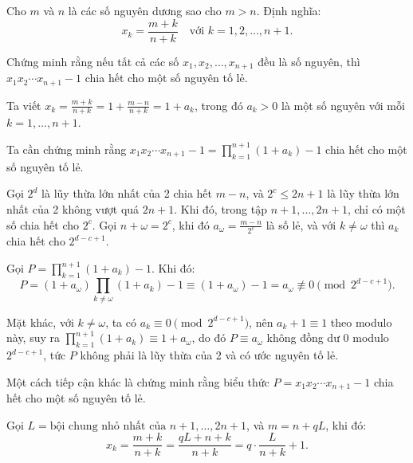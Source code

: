 \ifshowproblemandsoln
\ifshowproblem\begin{problem}\label{problem:IMO-2015-SL-P3}\fi
\ifshowsoln\begin{problem}\fi
    Cho \( m \) và \( n \) là các số nguyên dương sao cho \( m > n \). Định nghĩa:
    \[
        x_k = \frac{m + k}{n + k} \quad \text{với } k = 1, 2, \ldots, n + 1.
    \]

    Chứng minh rằng nếu tất cả các số \( x_1, x_2, \ldots, x_{n+1} \) đều là số nguyên,
    thì \( x_1 x_2 \cdots x_{n+1} - 1 \) chia hết cho một số nguyên tố lẻ.    
\end{problem}
\fi

\ifshowsoln
\begin{soln}\footnotemark
    Ta viết \(x_k = \frac{m+k}{n+k} = 1 + \frac{m-n}{n+k} = 1 + a_k\), trong đó \(a_k > 0\) là một số nguyên với mỗi \(k = 1, \ldots, n+1\).

    Ta cần chứng minh rằng \(x_1 x_2 \cdots x_{n+1} - 1 = \prod_{k=1}^{n+1}(1 + a_k) - 1\) chia hết cho một số nguyên tố lẻ.

    Gọi \(2^d\) là lũy thừa lớn nhất của 2 chia hết \(m - n\), và \(2^c \le 2n + 1\) là lũy thừa lớn nhất của 2 không vượt quá \(2n + 1\).
    Khi đó, trong tập \(n+1, \ldots, 2n+1\), chỉ có một số chia hết cho \(2^c\).
    Gọi \(n + \omega = 2^c\), khi đó \(a_\omega = \frac{m - n}{2^c}\) là số lẻ, và với \(k \ne \omega\) thì \(a_k\) chia hết cho \(2^{d - c + 1}\).

    Gọi \(P = \prod_{k=1}^{n+1}(1 + a_k) - 1\). Khi đó:
    \[
        P = (1 + a_\omega)\prod_{k \ne \omega}(1 + a_k) - 1 \equiv (1 + a_\omega) - 1 = a_\omega \not\equiv 0 \pmod{2^{d - c + 1}}.
    \]

    Mặt khác, với \(k \ne \omega\), ta có \(a_k \equiv 0 \pmod{2^{d - c + 1}}\), nên \(a_k + 1 \equiv 1\) theo modulo này,
    suy ra \(\prod_{k=1}^{n+1}(1 + a_k) \equiv 1 + a_\omega\), do đó \(P \equiv a_\omega\) không đồng dư 0 modulo \(2^{d - c + 1}\),
    tức \(P\) không phải là lũy thừa của 2 và có ước nguyên tố lẻ.
\end{soln}

\begin{remark*}
    Một cách tiếp cận khác là chứng minh rằng biểu thức \(P = x_1 x_2 \cdots x_{n+1} - 1\) chia hết cho một số nguyên tố lẻ.

    Gọi \(L = \text{bội chung nhỏ nhất của } n+1, \ldots, 2n+1\), và \(m = n + qL\), khi đó:
    \[
        x_k = \frac{m + k}{n + k} = \frac{qL + n + k}{n + k} = q\cdot\frac{L}{n + k} + 1.
    \]


\end{remark*}
\end{problem}
